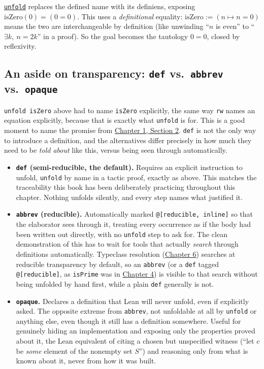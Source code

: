 \href{https://lean-lang.org/doc/reference/latest/Tactic-Proofs/Tactic-Reference/}{\texttt{unfold}} replaces the defined name with its definiens, exposing \(\mathrm{isZero}(0) = (0 = 0)\). This uses a \emph{definitional} equality: \(\mathrm{isZero} := (n \mapsto n = 0)\) means the two are interchangeable by definition (like unwinding ``\(n\) is even'' to ``\(\exists k,\ n = 2k\)'' in a proof). So the goal becomes the tautology \(0 = 0\), closed by reflexivity.

\subsection{\texorpdfstring{An aside on transparency: \texttt{def} vs.~\texttt{abbrev} vs.~\texttt{opaque}}{An aside on transparency: def vs.~abbrev vs.~opaque}}\label{sec:05-tactics:04-more-tactics:2}

\texttt{unfold isZero} above had to name \texttt{isZero} explicitly, the same way \texttt{rw} names an equation explicitly, because that is exactly what \texttt{unfold} is for. This is a good moment to name the promise from \hyperref[sec:01-basics:02-def-let-implicit:1]{Chapter 1, Section 2}. \texttt{def} is not the only way to introduce a definition, and the alternatives differ precisely in how much they need to be \emph{told about} like this, versus being seen through automatically.

\begin{itemize}
\tightlist
\item
  \textbf{\texttt{def} (semi-reducible, the default).} Requires an explicit instruction to unfold, \texttt{unfold} by name in a tactic proof, exactly as above. This matches the traceability this book has been deliberately practicing throughout this chapter. Nothing unfolds silently, and every step names what justified it.
\item
  \textbf{\texttt{abbrev} (reducible).} Automatically marked \texttt{@[reducible, inline]} so that the elaborator sees through it, treating every occurrence as if the body had been written out directly, with no \texttt{unfold} step to ask for. The clean demonstration of this has to wait for tools that actually \emph{search} through definitions automatically. Typeclass resolution (\hyperref[sec:06-rigor-check:01-structure-vs-class:1]{Chapter 6}) searches at reducible transparency by default, so an \texttt{abbrev} (or a \texttt{def} tagged \texttt{@[reducible]}, as \texttt{isPrime} was in \hyperref[sec:04-propositions-and-proofs:06-quantifiers:1]{Chapter 4}) is visible to that search without being unfolded by hand first, while a plain \texttt{def} generally is not.
\item
  \textbf{\texttt{opaque}.} Declares a definition that Lean will never unfold, even if explicitly asked. The opposite extreme from \texttt{abbrev}, not unfoldable at all by \texttt{unfold} or anything else, even though it still has a definition somewhere. Useful for genuinely hiding an implementation and exposing only the properties proved about it, the Lean equivalent of citing a chosen but unspecified witness (``let \(c\) be \emph{some} element of the nonempty set \(S\)'') and reasoning only from what is known about it, never from how it was built.
\end{itemize}

